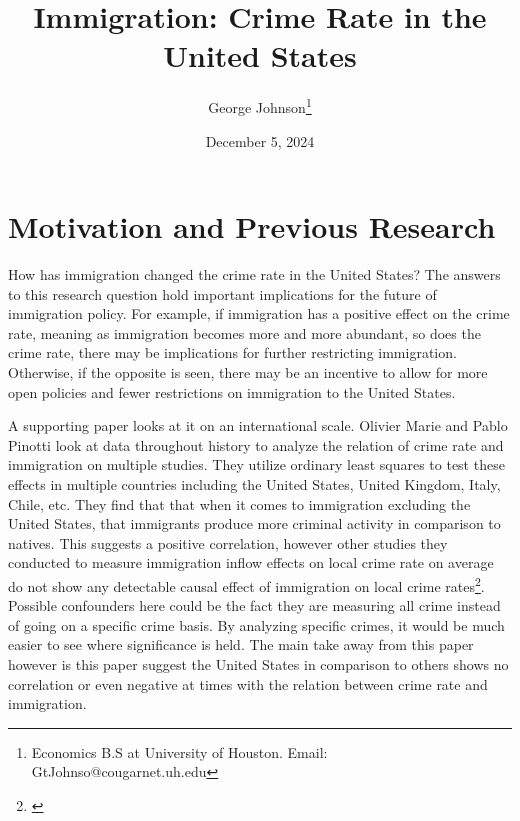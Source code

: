 \documentclass[12pt,letterpaper]{article}
\begin{document}
    \title{\textbf{Immigration: Crime Rate in the United States}}
    \author{George Johnson\footnote{Economics B.S at University of Houston. Email: GtJohnso@cougarnet.uh.edu}}
\date{December 5, 2024}
\maketitle

\newpage

\section*{Motivation and Previous Research}
    \indent     How has immigration changed the crime rate in the United States? The answers to this    research question hold important implications for the future of immigration policy. For example, if immigration has a positive effect on the crime rate, meaning as immigration becomes more and more abundant, so does the crime rate, there may be implications for further restricting immigration. Otherwise, if the opposite is seen, there may be an incentive to allow for more open policies and fewer restrictions on immigration to the United States.
    
    \indent      A supporting paper looks at it on an international scale. Olivier Marie and Pablo Pinotti look at data throughout history to analyze the relation of crime rate and immigration on multiple studies. They utilize ordinary least squares to test these effects in multiple countries including the United States, United Kingdom, Italy, Chile, etc. They find that that when it comes to immigration excluding the United States, that immigrants produce more criminal activity in comparison to natives. This suggests a positive correlation, however other studies they conducted to measure immigration inflow effects on local crime rate on average do not show any detectable causal effect of immigration on local crime rates\footnote{\citep{M_P}}. Possible confounders here could be the fact they are measuring all crime instead of going on a specific crime basis. By analyzing specific crimes, it would be much easier to see where significance is held. The main take away from this paper however is this paper suggest the United States in comparison to others shows no correlation or even negative at times with the relation between crime rate and immigration. 
    
\end{document}
